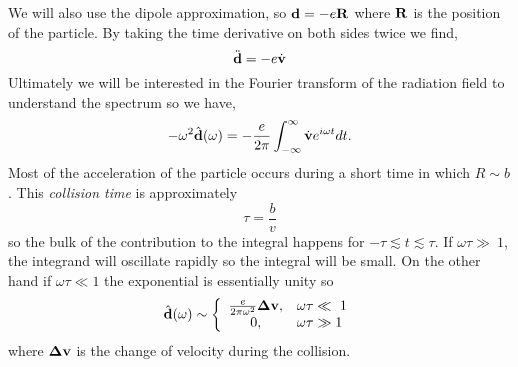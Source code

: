 We will also use the dipole approximation, so ${\bf d} = -e {\bf R}$
where ${\bf R}$ is the position of the particle.  By taking the time
derivative on both sides twice we find,
\begin{equation}
\ddot{\bf d} = -e\dot{\bf v}
\label{eq:326}
\end{equation}
Ultimately we will be interested in the Fourier transform of the
radiation field to understand the spectrum so we have,
\begin{equation}
-\omega^2 \hat{\bf d}(\omega) = -\frac{e}{2\pi} \int_{-\infty}^\infty
\dot{\bf v} e^{i\omega t} dt.
\label{eq:327}
\end{equation}
Most of the acceleration of the particle occurs during a short time in
which $R\sim b$.  This {\it collision time} is approximately
\begin{equation}
\tau = \frac{b}{v}
\label{eq:328}
\end{equation}
so the bulk of the contribution to the integral happens for $-\tau \lesssim t
\lesssim \tau$.  If $\omega \tau \gg\ 1$, the integrand will oscillate 
rapidly so the integral will be small.  On the other hand if
$\omega\tau \ll 1$ the exponential is essentially unity so
\begin{equation}
\hat{\bf d}(\omega) \sim \left \{ 
\begin{array}{cl}
\frac{e}{2\pi\omega^2} {\bf \Delta v}, &\omega \tau \ll\ 1 \\
 0, & \omega\tau \gg 1
\end{array}
\right .
\label{eq:329}
\end{equation}
where $\bf{\Delta v}$ is the change of velocity during the collision.

